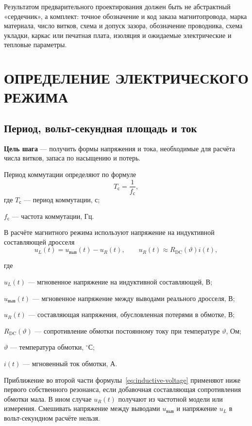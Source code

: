 \documentclass[14pt,a4paper]{extarticle}
\newenvironment{whereblock}
 {\par\noindent где\par
  \begin{list}{}{\setlength{\leftmargin}{12.5mm}
                  \setlength{\itemindent}{-12.5mm}
                  \setlength{\itemsep}{0pt}
                  \setlength{\parsep}{0pt}
                  \setlength{\topsep}{0pt}}}
 {\end{list}}
\newcommand{\whereitem}[2]{\item[] #1 --- #2}
\begin{document}
Результатом предварительного проектирования должен быть не абстрактный
«сердечник», а комплект:
точное обозначение и код заказа магнитопровода, марка материала, число
витков, схема и допуск зазора, обозначение проводника, схема укладки,
каркас или печатная плата, изоляция и ожидаемые электрические и тепловые
параметры.


\section{ОПРЕДЕЛЕНИЕ ЭЛЕКТРИЧЕСКОГО РЕЖИМА}
\label{sec:electrical-mode}

\subsection{Период, вольт-секундная площадь и ток}

\textbf{Цель шага} --- получить формы напряжения и тока, необходимые для
расчёта числа витков, запаса по насыщению и потерь.

Период коммутации определяют по формуле
\begin{equation}
 T_{\text{с}}=\frac{1}{f_{\text{с}}},
 \label{eq:period}
\end{equation}
где $T_{\text{с}}$ --- период коммутации, с;\par\noindent
$f_{\text{с}}$ --- частота коммутации, Гц.

В расчёте магнитного режима используют напряжение на индуктивной
составляющей дросселя
\begin{equation}
 u_L(t)=u_{\text{выв}}(t)-u_R(t),
 \qquad
 u_R(t)\approx R_{\text{DC}}(\vartheta)i(t),
 \label{eq:inductive-voltage}
\end{equation}
\begin{whereblock}
\whereitem{$u_L(t)$}{мгновенное напряжение на индуктивной составляющей,
В;}
\whereitem{$u_{\text{выв}}(t)$}{мгновенное напряжение между выводами
реального дросселя, В;}
\whereitem{$u_R(t)$}{составляющая напряжения, обусловленная потерями в
обмотке, В;}
\whereitem{$R_{\text{DC}}(\vartheta)$}{сопротивление обмотки постоянному
току при температуре $\vartheta$, Ом;}
\whereitem{$\vartheta$}{температура обмотки, $^{\circ}\text{С}$;}
\whereitem{$i(t)$}{мгновенный ток обмотки, А.}
\end{whereblock}

Приближение во второй части формулы~\eqref{eq:inductive-voltage} применяют
ниже первого собственного резонанса, если добавочная составляющая
сопротивления обмотки мала. В ином случае $u_R(t)$ получают из частотной
модели или измерения. Смешивать напряжение между выводами $u_{\text{выв}}$
и напряжение $u_L$ в вольт-секундном расчёте нельзя.
\end{document}

